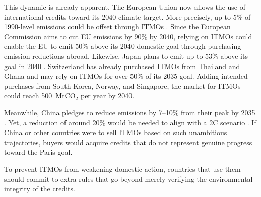 \documentclass[12pt,english]{article}
\begin{document}
This dynamic is already apparent. %
The European Union now allows the use of international credits toward its 2040 climate target. More precisely, up to 5\% of 1990-level emissions could be offset through ITMOs \citep{european_parliament_framework_2025}. 
Since the European Commission aims to cut EU emissions by 90\% by 2040, relying on ITMOs could enable the EU to emit 50\% above its 2040 domestic goal through purchasing emission reductions abroad. Likewise, Japan plans to emit up to 53\% above its goal in 2040 \citep{japan_japans_2025}. Switzerland has already purchased ITMOs from Thailand and Ghana and may rely on ITMOs for over 50\% of its 2035 goal. Adding intended purchases from South Korea, Norway, and Singapore, the market for ITMOs could reach 500~MtCO$_\text{2}$ per year by 2040. %

Meanwhile, China pledges to reduce emissions by 7--10\% from their peak by 2035 \citep{china_chinas_2025}. 
Yet, a reduction of around 20\% would be needed to align with a 2\textdegree{}C scenario \citep{he_towards_2022}. %
If China or other countries were to sell ITMOs based on such unambitious trajectories, buyers would acquire credits that do not represent genuine progress toward the Paris goal.

To prevent ITMOs from weakening domestic action, countries that use them should commit to extra rules that go beyond merely verifying the environmental integrity of the credits. %

\end{document}
